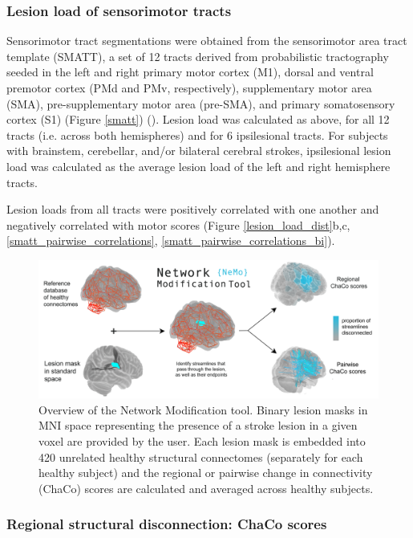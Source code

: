 \documentclass[10pt]{article}
\begin{document}
\subsubsection*{Lesion load of sensorimotor tracts}
Sensorimotor tract segmentations were obtained from the sensorimotor area tract template (SMATT), a set of 12 tracts derived from probabilistic tractography seeded in the left and right primary motor cortex (M1), dorsal and ventral premotor cortex (PMd and PMv, respectively), supplementary motor area (SMA), pre-supplementary motor area (pre-SMA), and primary somatosensory cortex (S1) (Figure \ref{smatt}) (\cite{Archer2018-ti}). Lesion load was calculated as above, for all 12 tracts (i.e. across both hemispheres) and for 6 ipsilesional tracts. For subjects with brainstem, cerebellar, and/or bilateral cerebral strokes, ipsilesional lesion load was calculated as the average lesion load of the left and right hemisphere tracts.

Lesion loads from all tracts were positively correlated with one another and negatively correlated with motor scores (Figure \ref{lesion_load_dist}b,c, \ref{smatt_pairwise_correlations}, \ref{smatt_pairwise_correlations_bi}). 

\begin{figure}[ht]
  \centering
  \includegraphics[width=1\linewidth]{figures/NeMo.png}
  \caption{Overview of the Network Modification tool. Binary lesion masks in MNI space representing the presence of a stroke lesion in a given voxel are provided by the user. Each lesion mask is embedded into 420 unrelated healthy structural connectomes (separately for each healthy subject) and the regional or pairwise change in connectivity (ChaCo) scores are calculated and averaged across healthy subjects. }
  \label{nemo}
\end{figure}

\subsubsection*{Regional structural disconnection: ChaCo scores}
\end{document}
